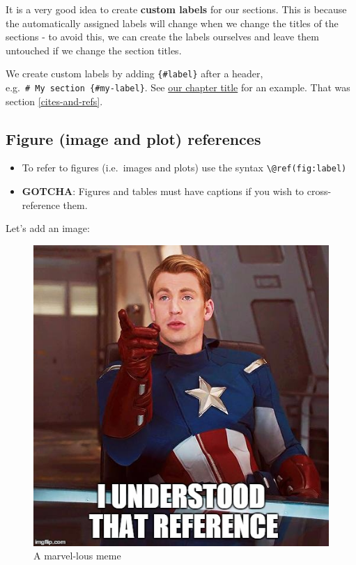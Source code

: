 \documentclass[a4paper, nobind]{templates/ociamthesis}
\providecommand{\tightlist}{%
  \setlength{\itemsep}{0pt}\setlength{\parskip}{0pt}}
\begin{document}
It is a very good idea to create \textbf{custom labels} for our sections. This is because the automatically assigned labels will change when we change the titles of the sections - to avoid this, we can create the labels ourselves and leave them untouched if we change the section titles.

We create custom labels by adding \texttt{\{\#label\}} after a header, e.g.~\texttt{\#\ My\ section\ \{\#my-label\}}.
See \protect\hyperlink{cites-and-refs}{our chapter title} for an example. That was section \ref{cites-and-refs}.

\hypertarget{figure-image-and-plot-references}{%
\subsection{Figure (image and plot) references}\label{figure-image-and-plot-references}}

\begin{itemize}
\tightlist
\item
  To refer to figures (i.e.~images and plots) use the syntax \texttt{\textbackslash{}@ref(fig:label)}
\item
  \textbf{GOTCHA}: Figures and tables must have captions if you wish to cross-reference them.
\end{itemize}

Let's add an image:

\begin{figure}

{\centering \includegraphics[width=0.65\linewidth]{figures/sample-content/captain} 

}

\caption{A marvel-lous meme}\label{fig:captain}
\end{figure}
\end{document}
